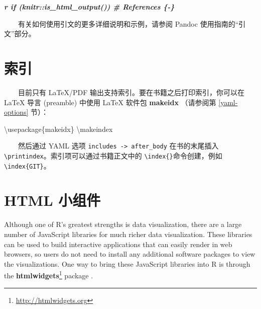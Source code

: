 \documentclass[
  12pt,
]{krantz}
\newenvironment{Shaded}{\begin{snugshade}}{\end{snugshade}}
\newcommand{\BuiltInTok}[1]{#1}
\newcommand{\ExtensionTok}[1]{#1}
\newcommand{\FunctionTok}[1]{\textcolor[rgb]{0.00,0.00,0.00}{#1}}
\newcommand{\InformationTok}[1]{\textcolor[rgb]{0.56,0.35,0.01}{\textbf{\textit{#1}}}}
\newcommand{\NormalTok}[1]{#1}
\renewcommand{\href}[2]{#2\footnote{\url{#1}}}
\theoremstyle{definition}
\theoremstyle{definition}
\theoremstyle{definition}
\theoremstyle{definition}
\theoremstyle{remark}
\begin{document}
\begin{Shaded}
\begin{Highlighting}[]
\InformationTok{\textasciigrave{}r if (knitr::is\_html\_output()) \textquotesingle{}\# References \{{-}\}\textquotesingle{}\textasciigrave{}}
\end{Highlighting}
\end{Shaded}

  有关如何使用引文的更多详细说明和示例，请参阅 Pandoc 使用指南的``引文''部分。

\hypertarget{latex-index}{%
\section{索引}\label{latex-index}}

  目前只有 LaTeX/PDF 输出支持索引。要在书籍之后打印索引，你可以在 LaTeX 导言 (preamble) 中使用 LaTeX 软件包 \textbf{makeidx} （请参阅第 \ref{yaml-options} 节）：

\begin{Shaded}
\begin{Highlighting}[]
\BuiltInTok{\textbackslash{}usepackage}\NormalTok{\{}\ExtensionTok{makeidx}\NormalTok{\}}
\FunctionTok{\textbackslash{}makeindex}
\end{Highlighting}
\end{Shaded}

  然后通过 YAML 选项 \texttt{includes\ -\textgreater{}\ after\_body} 在书的末尾插入 \texttt{\textbackslash{}printindex}。索引项可以通过书籍正文中的 \texttt{\textbackslash{}index\{\}}命令创建，例如 \texttt{\textbackslash{}index\{GIT\}}。

\hypertarget{html-ux5c0fux7ec4ux4ef6}{%
\section{HTML 小组件}\label{html-ux5c0fux7ec4ux4ef6}}

Although one of R's greatest strengths is data visualization, there are a large number of JavaScript libraries for much richer data visualization. These libraries can be used to build interactive applications that can easily render in web browsers, so users do not need to install any additional software packages to view the visualizations. One way to bring these JavaScript libraries into R is through the \href{http://htmlwidgets.org}{\textbf{htmlwidgets}} package \citep{R-htmlwidgets}.
\end{document}
